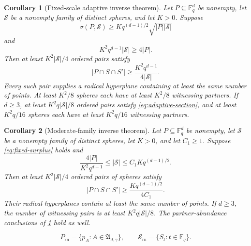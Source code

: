 \documentclass[10pt,a4paper]{amsart}
\newtheorem{corollary}{Corollary}
\begin{document}
\begin{corollary}[Fixed-scale adaptive inverse theorem]\label{cor:fixed-adaptive}
Let $P\subseteq\mathbb F_q^d$ be nonempty, let $\mathcal S$ be a nonempty family of distinct spheres, and let $K>0$.  Suppose
\begin{equation}\label{eq:fixed-surplus}
 \sigma(P,\mathcal S)\ge Kq^{(d-1)/2}\sqrt{|P||\mathcal S|}
\end{equation}
and
\begin{equation}\label{eq:point-sensitive-lower}
 K^2q^{d-1}|\mathcal S|\ge4|P|.
\end{equation}
Then at least $K^2|\mathcal S|/4$ ordered pairs satisfy
\begin{equation}\label{eq:adaptive-section}
 |P\cap S\cap S'|\ge
 \frac{K^2q^{d-1}}{4|\mathcal S|}.
\end{equation}
Every such pair supplies a radical hyperplane containing at least the same number of points.  At least $K^2/8$ spheres each have at least $K^2/8$ witnessing partners.  If $d\ge3$, at least $K^2q|\mathcal S|/8$ ordered pairs satisfy \eqref{eq:adaptive-section}, and at least $K^2q/16$ spheres each have at least $K^2q/16$ witnessing partners.
\end{corollary}

\begin{corollary}[Moderate-family inverse theorem]\label{cor:moderate}
Let $P\subseteq\mathbb F_q^d$ be nonempty, let $\mathcal S$ be a nonempty family of distinct spheres, let $K>0$, and let $C_1\ge1$.  Suppose \eqref{eq:fixed-surplus} holds and
\begin{equation}\label{eq:moderate-window}
 \frac{4|P|}{K^2q^{d-1}}
 \le|\mathcal S|
 \le C_1Kq^{(d-1)/2}.
\end{equation}
Then at least $K^2|\mathcal S|/4$ ordered pairs of spheres satisfy
\begin{equation}\label{eq:moderate-section}
 |P\cap S\cap S'|\ge
 \frac{Kq^{(d-1)/2}}{4C_1}.
\end{equation}
Their radical hyperplanes contain at least the same number of points.  If $d\ge3$, the number of witnessing pairs is at least $K^2q|\mathcal S|/8$.  The partner-abundance conclusions of \cref{cor:fixed-adaptive} hold as well.
\end{corollary}

\begin{equation}\label{eq:rnc-system}
 P_{\mathrm{rn}}=\{p_A:A\in\mathfrak A_{d,\gamma}\},
 \qquad
 \mathcal S_{\mathrm{rn}}=\{S_t:t\in\mathbb F_q\}.
\end{equation}
\end{document}
